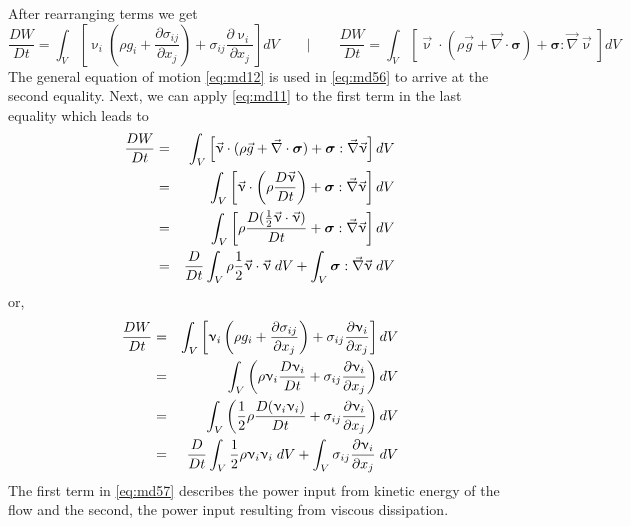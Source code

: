 After rearranging terms we get
\begin{equation}
\frac{DW}{Dt} = \int_V 
\left[ \upnu_i \left( \rho g_i + \frac{\partial\sigma_{ij}}{\partial x_j}  \right) 
+ \sigma_{ij} \frac{\partial \upnu_i }{\partial x_j}
\right] dV
\quad
\quad
\bigg\rvert
\quad
\quad
\frac{DW}{Dt} = \int_V 
\left[
\vec\upnu\cdot ( \rho \vec{g} + \vec\nabla\cdot {\bm \sigma})
+{\bm \sigma} : \vec\nabla\vec\upnu
\right]
dV
\label{eq:md56}
\end{equation}
The general equation of motion \eqref{eq:md12} is used in \eqref{eq:md56} 
to arrive at the second equality.
Next, we can apply \eqref{eq:md11} to the first term in the last equality which leads to
\begin{eqnarray}
\frac{DW}{Dt} 
&=& \int_V \left[ \vec\upnu\cdot ( \rho \vec{g} + \vec\nabla\cdot {\bm \sigma})
+{\bm \sigma} : \vec\nabla\vec\upnu \right] dV \nonumber\\
&=&\int_V \left[ \vec\upnu\cdot \left( \rho \frac{D \vec{\upnu}}{Dt} \right)
+{\bm \sigma} : \vec\nabla\vec\upnu \right] dV \nonumber\\
&=& \int_V \left[ \rho \frac{D (\frac12 \vec\upnu\cdot\vec{\upnu} )}{Dt} 
+{\bm \sigma} : \vec\nabla\vec\upnu \right] dV \nonumber\\
&=&\frac{D}{Dt} \int_V  \rho \frac12 \vec\upnu\cdot\vec{\upnu}\;  dV
+\int_V {\bm \sigma} : \vec\nabla\vec\upnu \; dV 
\end{eqnarray}
or,
\begin{eqnarray}
\frac{DW}{Dt} &=& 
\int_V \left[ \upnu_i \left( \rho g_i +  \frac{\partial\sigma_{ij}}{\partial x_j}  \right) 
+ \sigma_{ij} \frac{\partial \upnu_i }{\partial x_j}  \right] dV \nonumber\\
&=& \int_V \left(\rho \upnu_i \frac{D\upnu_i}{Dt} 
+ \sigma_{ij}  \frac{\partial \upnu_i }{\partial x_j} \right) dV \nonumber\\
&=& \int_V \left(\frac12 \rho \frac{D (\upnu_i\upnu_i)}{Dt} 
+ \sigma_{ij}  \frac{\partial \upnu_i }{\partial x_j} \right) dV \nonumber\\
&=& \frac{D}{Dt} \int_V \frac12 \rho \upnu_i\upnu_i \; dV + 
\int_V   \sigma_{ij}  \frac{\partial \upnu_i }{\partial x_j} \; dV 
\label{eq:md57}
\end{eqnarray}
The first term in \eqref{eq:md57} 
describes the power input from kinetic energy of the flow and the
second, the power input resulting from viscous dissipation.

